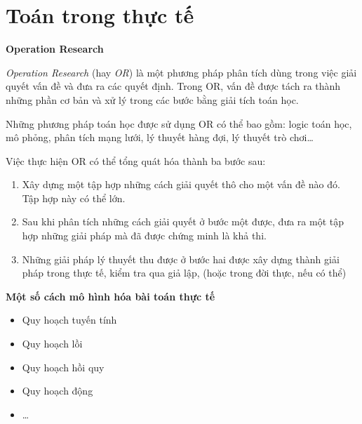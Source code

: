 \documentclass[14pt]{extarticle}
\begin{document}
\section{Toán trong thực tế}
\textbf{Operation Research}\par
\textit{Operation Research} (hay \textit{OR}) là một phương pháp phân tích dùng trong việc giải quyết vấn đề và đưa ra các quyết định. Trong OR, vấn đề được tách ra thành những phần cơ bản và xử lý trong các bước bằng giải tích toán học.

Những phương pháp toán học được sử dụng OR có thể bao gồm: logic toán học, mô phỏng, phân tích mạng lưới, lý thuyết hàng đợi, lý thuyết trò chơi\ldots

Việc thực hiện OR có thể tổng quát hóa thành ba bước sau:
\begin{enumerate}
	\item Xây dựng một tập hợp những cách giải quyết thô cho một vấn đề nào đó. Tập hợp này có thể lớn.
	\item Sau khi phân tích những cách giải quyết ở bước một được, đưa ra một tập hợp những giải pháp mà đã được chứng minh là khả thi.
	\item Những giải pháp lý thuyết thu được ở bước hai được xây dựng thành giải pháp trong thực tế, kiểm tra qua giả lập, (hoặc trong đời thực, nếu có thể)
\end{enumerate}

\textbf{Một số cách mô hình hóa bài toán thực tế}
\begin{itemize}
	\item Quy hoạch tuyến tính
	\item Quy hoạch lồi
	\item Quy hoạch hồi quy
	\item Quy hoạch động
	\item \ldots
\end{itemize}
\end{document}
